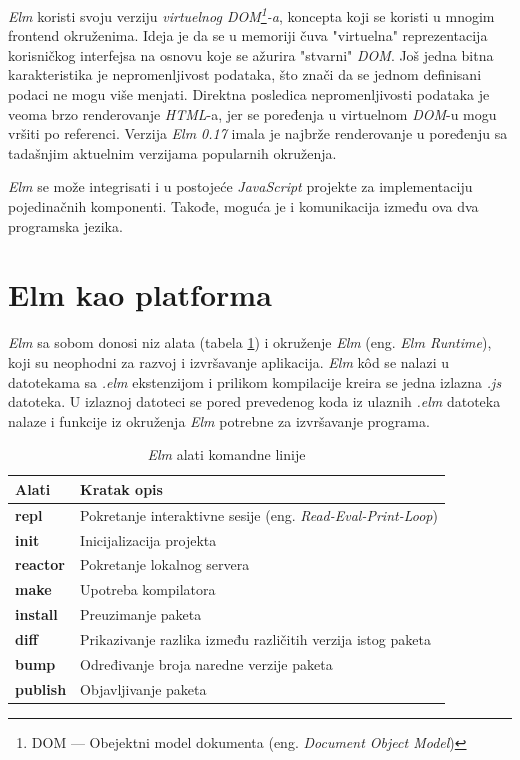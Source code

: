 \documentclass[12pt,oneside]{memoir}
\begin{document}
\emph{Elm} koristi svoju verziju \emph{virtuelnog DOM\footnote{DOM --- Obejektni model
dokumenta (eng. \emph{Document Object Model})\cite{dom}}-a}, koncepta koji se koristi u mnogim
frontend okruženima. Ideja je da se u memoriji čuva "virtuelna" reprezentacija
korisničkog interfejsa na osnovu koje se ažurira "stvarni" \emph{DOM}. Još jedna bitna
karakteristika je nepromenljivost podataka, što znači da se jednom definisani
podaci ne mogu više menjati. Direktna posledica nepromenljivosti podataka je veoma
brzo renderovanje \emph{HTML}-a, jer se poređenja u virtuelnom \emph{DOM}-u mogu vršiti po referenci. 
Verzija \emph{Elm 0.17} imala je najbrže renderovanje u poređenju sa tadašnjim aktuelnim verzijama 
popularnih okruženja\cite{elm-html}.

\emph{Elm} se može integrisati i u postojeće \emph{JavaScript} projekte za implementaciju pojedinačnih 
komponenti. Takođe, moguća je i komunikacija između ova dva programska jezika. 

\section{Elm kao platforma}
\emph{Elm} sa sobom donosi niz alata (tabela \ref{table:elmTools}) i okruženje \emph{Elm} (eng. \emph{Elm 
Runtime}), koji su neophodni za razvoj i izvršavanje aplikacija. \emph{Elm} k\^{o}d se nalazi u 
datotekama sa \emph{.elm} ekstenzijom i prilikom kompilacije kreira se jedna izlazna 
\emph{.js} datoteka. U izlaznoj datoteci se pored prevedenog koda iz ulaznih \emph{.elm} 
datoteka nalaze i funkcije iz okruženja \emph{Elm} potrebne za izvršavanje programa.

\begin{table}[h!]
\centering
\begin{tabular}{|l l|} 
 \hline 
 Alati & Kratak opis  \\ [0.5ex] 
 \hline
  \textbf{repl} & Pokretanje interaktivne sesije (eng. \emph{Read-Eval-Print-Loop}) \\ 
  \textbf{init} & Inicijalizacija projekta \\
  \textbf{reactor} & Pokretanje lokalnog servera \\
  \textbf{make} & Upotreba kompilatora \\
  \textbf{install}  & Preuzimanje paketa \\ 
  \textbf{diff} & Prikazivanje razlika između različitih verzija istog paketa \\
  \textbf{bump} & Određivanje broja naredne verzije paketa  \\
  \textbf{publish} & Objavljivanje paketa \\[1ex] 
 \hline
\end{tabular}
\caption{\emph{Elm} alati komandne linije}
\label{table:elmTools}
\end{table}
\end{document}
